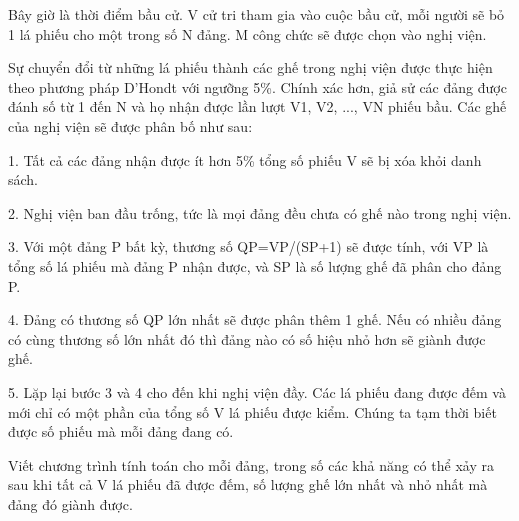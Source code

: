 Bây giờ là thời điểm bầu cử. V cử tri tham gia vào cuộc bầu cử, mỗi người sẽ bỏ 1 lá phiếu cho một trong số N đảng. M công chức sẽ được chọn vào nghị viện.  

   Sự chuyển đổi từ những lá phiếu thành các ghế trong nghị viện được thực hiện theo phương pháp D'Hondt với ngưỡng 5\%. Chính xác hơn, giả sử các đảng được đánh số từ 1 đến N và họ nhận được lần lượt V1, V2, ..., VN phiếu bầu. Các ghế của nghị viện sẽ được phân bố như sau:  
\begin{itemize}

    1. Tất cả các đảng nhận được ít hơn 5\% tổng số phiếu V sẽ bị xóa khỏi danh sách.   

    2. Nghị viện ban đầu trống, tức là mọi đảng đều chưa có ghế nào trong nghị viện.   

    3. Với một đảng P bất kỳ, thương số QP=VP/(SP+1) sẽ được tính, với VP là tổng số lá phiếu mà đảng P nhận được, và SP là số lượng ghế đã phân cho đảng P.   

    4. Đảng có thương số QP lớn nhất sẽ được phân thêm 1 ghế. Nếu có nhiều đảng có cùng thương số lớn nhất đó thì đảng nào có số hiệu nhỏ hơn sẽ giành được ghế.   

    5. Lặp lại bước 3 và 4 cho đến khi nghị viện đầy. Các lá phiếu đang được đếm và mới chỉ có một phần của tổng số V lá phiếu được kiểm. Chúng ta tạm thời biết được số phiếu mà mỗi đảng đang có.   
\end{itemize}

   Viết chương trình tính toán cho mỗi đảng, trong số các khả năng có thể xảy ra sau khi tất cả V lá phiếu đã được đếm, số lượng ghế lớn nhất và nhỏ nhất mà đảng đó giành được.